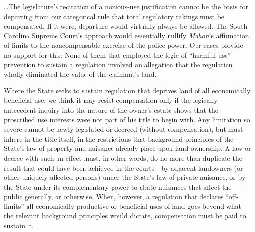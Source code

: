 \ldots The legislature's recitation of a noxious-use
justification cannot be the basis for departing from our categorical rule that
total regulatory takings must be compensated. If it were, departure would
virtually always be allowed. The South Carolina Supreme Court's approach would
essentially nullify \textit{Mahon}'s affirmation of limits to the noncompensable
exercise of the police power. Our cases provide no support for this: None of
them that employed the logic of ``harmful use'' prevention to sustain a
regulation involved an allegation that the regulation wholly eliminated the
value of the claimant's land.

Where the State seeks to sustain regulation that deprives land of all
economically beneficial use, we think it may resist compensation only if the
logically antecedent inquiry into the nature of the owner's estate shows that
the proscribed use interests were not part of his title to begin
with.
Any limitation so severe
cannot be newly legislated or decreed (without compensation), but must inhere in
the title itself, in the restrictions that background principles of the State's
law of property and nuisance already place upon land ownership.
A law or decree
with such an effect must, in other words, do no more than duplicate the result
that could have been achieved in the courts---by adjacent landowners (or other
uniquely affected persons) under the State's law of private nuisance, or by the
State under its complementary power to abate nuisances that affect the public
generally, or otherwise.
When, however, a regulation that declares ``off-limits'' all
economically productive or beneficial uses of land goes beyond what the relevant
background principles would dictate, compensation must be paid to sustain it.

